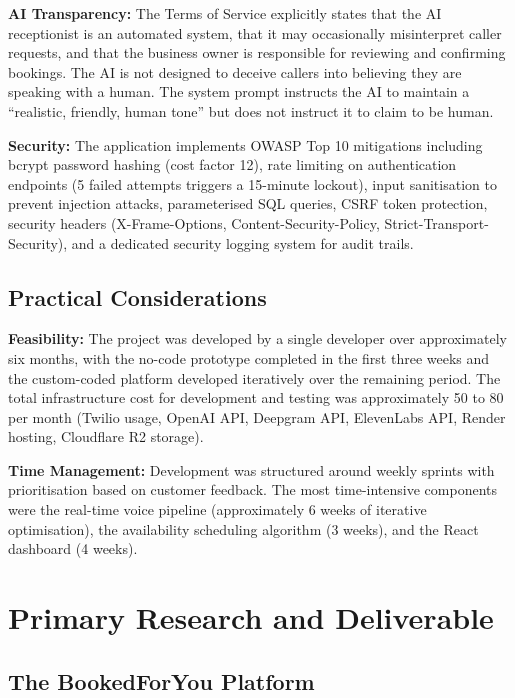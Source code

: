 \documentclass[conference]{IEEEtran}
\begin{document}
\textbf{AI Transparency:} The Terms of Service explicitly states that the AI receptionist is an automated system, that it may occasionally misinterpret caller requests, and that the business owner is responsible for reviewing and confirming bookings. The AI is not designed to deceive callers into believing they are speaking with a human. The system prompt instructs the AI to maintain a ``realistic, friendly, human tone'' but does not instruct it to claim to be human.

\textbf{Security:} The application implements OWASP Top 10 mitigations including bcrypt password hashing (cost factor 12), rate limiting on authentication endpoints (5 failed attempts triggers a 15-minute lockout), input sanitisation to prevent injection attacks, parameterised SQL queries, CSRF token protection, security headers (X-Frame-Options, Content-Security-Policy, Strict-Transport-Security), and a dedicated security logging system for audit trails.

\subsection{Practical Considerations}

\textbf{Feasibility:} The project was developed by a single developer over approximately six months, with the no-code prototype completed in the first three weeks and the custom-coded platform developed iteratively over the remaining period. The total infrastructure cost for development and testing was approximately \texteuro{}50 to \texteuro{}80 per month (Twilio usage, OpenAI API, Deepgram API, ElevenLabs API, Render hosting, Cloudflare R2 storage).

\textbf{Time Management:} Development was structured around weekly sprints with prioritisation based on customer feedback. The most time-intensive components were the real-time voice pipeline (approximately 6 weeks of iterative optimisation), the availability scheduling algorithm (3 weeks), and the React dashboard (4 weeks).


\section{Primary Research and Deliverable}

\subsection{The BookedForYou Platform}
\end{document}
